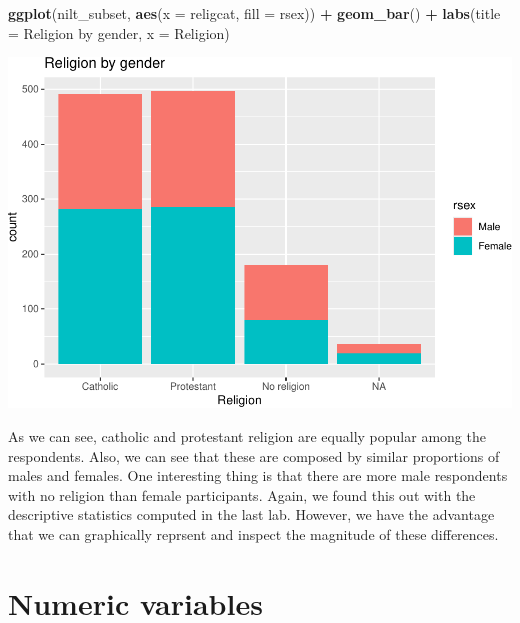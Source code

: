 \documentclass[
]{book}
\newenvironment{Shaded}{\begin{snugshade}}{\end{snugshade}}
\newcommand{\AttributeTok}[1]{\textcolor[rgb]{0.13,0.29,0.53}{#1}}
\newcommand{\FunctionTok}[1]{\textcolor[rgb]{0.13,0.29,0.53}{\textbf{#1}}}
\newcommand{\NormalTok}[1]{#1}
\newcommand{\SpecialCharTok}[1]{\textcolor[rgb]{0.81,0.36,0.00}{\textbf{#1}}}
\newcommand{\StringTok}[1]{\textcolor[rgb]{0.31,0.60,0.02}{#1}}
\begin{document}
\begin{Shaded}
\begin{Highlighting}[]
\FunctionTok{ggplot}\NormalTok{(nilt\_subset, }\FunctionTok{aes}\NormalTok{(}\AttributeTok{x =}\NormalTok{ religcat, }\AttributeTok{fill =}\NormalTok{ rsex)) }\SpecialCharTok{+}
  \FunctionTok{geom\_bar}\NormalTok{() }\SpecialCharTok{+}
  \FunctionTok{labs}\NormalTok{(}\AttributeTok{title =} \StringTok{\textquotesingle{}Religion by gender\textquotesingle{}}\NormalTok{, }\AttributeTok{x =} \StringTok{\textquotesingle{}Religion\textquotesingle{}}\NormalTok{)}
\end{Highlighting}
\end{Shaded}

\begin{flushleft}\includegraphics[width=1\linewidth]{lab-workbook_files/figure-latex/unnamed-chunk-67-1} \end{flushleft}

As we can see, catholic and protestant religion are equally popular among the respondents. Also, we can see that these are composed by similar proportions of males and females. One interesting thing is that there are more male respondents with no religion than female participants. Again, we found this out with the descriptive statistics computed in the last lab. However, we have the advantage that we can graphically reprsent and inspect the magnitude of these differences.

\hypertarget{numeric-variables}{%
\section{Numeric variables}\label{numeric-variables}}
\end{document}
